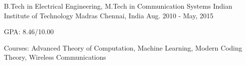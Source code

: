 \begin{cventries}
	\cventry
	{B.Tech in Electrical Engineering, M.Tech in Communication Systems}
	{Indian Institute of Technology Madras}
	{Chennai, India}
	{Aug. 2010 - May, 2015}
	{
		\begin{cvitems}
		\item{GPA: 8.46/10.00}
		\item{Courses: Advanced Theory of Computation, Machine Learning, Modern Coding Theory, Wireless Communications}
		\end{cvitems}
	}
\end{cventries}
